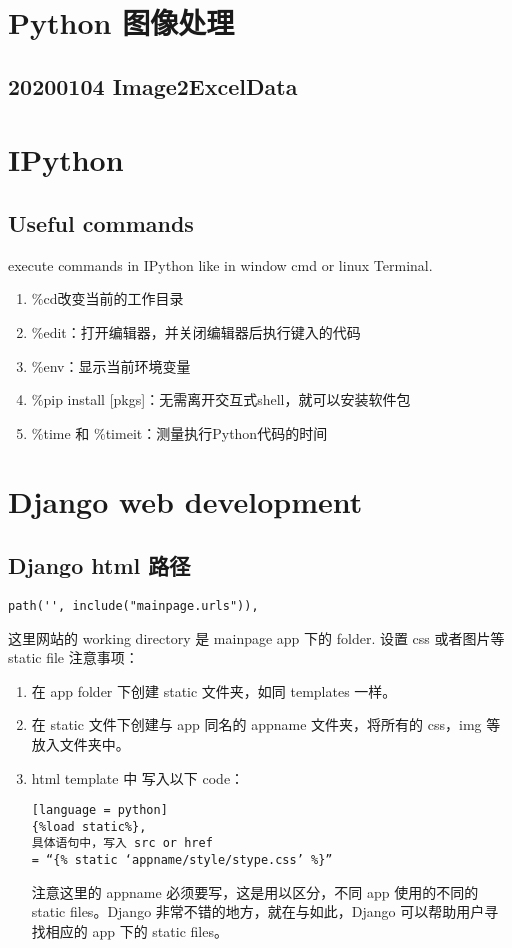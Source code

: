 \documentclass[UTF8,fancyhdr,a4paper]{ctexart}
\begin{document}
\section{Python 图像处理}
\subsection{20200104 Image2ExcelData}

\newpage
\section{IPython}
\subsection{Useful commands}
execute commands in IPython like in window cmd or linux Terminal.
\begin{enumerate}
      \item
            \%cd改变当前的工作目录
      \item
            \%edit：打开编辑器，并关闭编辑器后执行键入的代码
      \item
            \%env：显示当前环境变量
      \item
            \%pip install [pkgs]：无需离开交互式shell，就可以安装软件包
      \item
            \%time 和 \%timeit：测量执行Python代码的时间
\end{enumerate}

\newpage
\section{Django web development}
\subsection{Django html 路径}
\begin{verbatim}
path('', include("mainpage.urls")),
\end{verbatim}
这里网站的 working directory 是 mainpage app 下的 folder.
设置 css 或者图片等 static file 注意事项：\\
\begin{enumerate}
      \item 在 app folder 下创建 static 文件夹，如同 templates 一样。
      \item 在 static 文件下创建与 app 同名的 appname 文件夹，将所有的 css，img 等放入文件夹中。
      \item html template 中 写入以下 code：
            \begin{verbatim}[language = python] 
{%load static%}, 
具体语句中，写入 src or href 
= “{% static ‘appname/style/stype.css’ %}”
\end{verbatim}
            注意这里的 appname 必须要写，这是用以区分，不同 app 使用的不同的 static files。Django 非常不错的地方，就在与如此，Django 可以帮助用户寻找相应的 app 下的 static files。

\end{enumerate}
\end{document}
